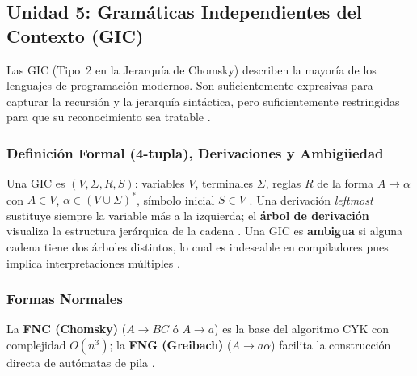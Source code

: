 \subsection*{Unidad 5: Gramáticas Independientes del Contexto (GIC)}

Las GIC (Tipo~2 en la Jerarquía de Chomsky) describen la mayoría de los lenguajes de programación
modernos. Son suficientemente expresivas para capturar la recursión y la jerarquía sintáctica, pero
suficientemente restringidas para que su reconocimiento sea tratable \cite{sipser2012}.

\subsubsection*{Definición Formal (4-tupla), Derivaciones y Ambigüedad}

Una GIC es $(V,\Sigma,R,S)$: variables $V$, terminales $\Sigma$, reglas $R$ de la forma
$A \to \alpha$ con $A \in V$, $\alpha \in (V \cup \Sigma)^*$, símbolo inicial $S \in V$
\cite{hopcroft2007es}. Una derivación \emph{leftmost} sustituye siempre la variable más a la
izquierda; el \textbf{árbol de derivación} visualiza la estructura jerárquica de la cadena
\cite{kelley2001}. Una GIC es \textbf{ambigua} si alguna cadena tiene dos árboles distintos,
lo cual es indeseable en compiladores pues implica interpretaciones múltiples \cite{sipser2012}.

\subsubsection*{Formas Normales}

La \textbf{FNC (Chomsky)} ($A \to BC$ ó $A \to a$) es la base del algoritmo CYK con complejidad
$O(n^3)$; la \textbf{FNG (Greibach)} ($A \to a\alpha$) facilita la construcción directa de
autómatas de pila \cite{hopcroft2007es}.

